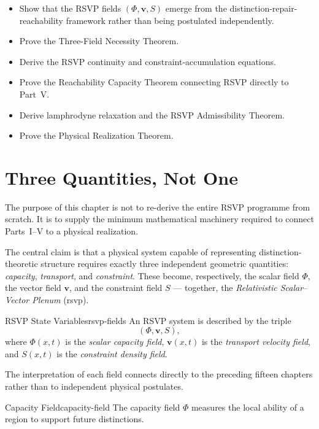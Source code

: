 \documentclass[12pt,twoside,openright]{book}
\newenvironment{objectives}{%
  \begin{tcolorbox}[colback=DistBlue!5,colframe=DistBlue,
    title={\faCheckCircle\enspace Learning Objectives},
    fonttitle=\sffamily\bfseries\color{white},
    attach boxed title to top left={yshift=-2mm,xshift=4mm},
    boxed title style={colback=DistBlue},breakable]
  \begin{itemize}[leftmargin=*,nosep]}{%
  \end{itemize}\end{tcolorbox}\vspace{1em}}
\begin{document}
\begin{objectives}
  \item Show that the RSVP fields $(\Phi,\mathbf{v},S)$ emerge
        from the distinction-repair-reachability framework
        rather than being postulated independently.
  \item Prove the Three-Field Necessity Theorem.
  \item Derive the RSVP continuity and constraint-accumulation
        equations.
  \item Prove the Reachability Capacity Theorem connecting
        RSVP directly to Part~V.
  \item Derive lamphrodyne relaxation and the RSVP
        Admissibility Theorem.
  \item Prove the Physical Realization Theorem.
\end{objectives}

\section{Three Quantities, Not One}
\label{sec:ch16-three}

The purpose of this chapter is not to re-derive the entire
RSVP programme from scratch. It is to supply the minimum
mathematical machinery required to connect
Parts~I--V to a physical realization.

The central claim is that a physical system capable of
representing distinction-theoretic structure requires
exactly three independent geometric quantities:
\emph{capacity}, \emph{transport}, and \emph{constraint}.
These become, respectively, the scalar field $\Phi$, the
vector field $\mathbf{v}$, and the constraint field $S$ —
together, the \emph{Relativistic Scalar--Vector Plenum}
(\gls{rsvp}).

\begin{definition}{RSVP State Variables}{rsvp-fields}
  An RSVP system is described by the triple
  \[
    (\Phi, \mathbf{v}, S),
  \]
  where $\Phi(x,t)$ is the \emph{scalar capacity field},
  $\mathbf{v}(x,t)$ is the \emph{transport velocity field},
  and $S(x,t)$ is the \emph{constraint density field}.
\end{definition}

The interpretation of each field connects directly to the
preceding fifteen chapters rather than to independent
physical postulates.

\begin{definition}{Capacity Field}{capacity-field}
  The capacity field $\Phi$ measures the local ability of
  a region to support future distinctions.
\end{definition}
\end{document}
